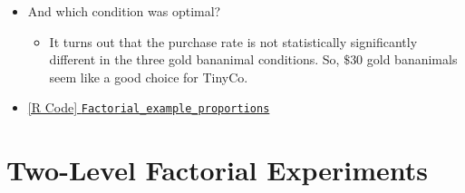 \begin{itemize}
\begin{itemize}
            \end{itemize}
      \item And which condition was optimal?
            \begin{itemize}
                  \item It turns out that the purchase rate is not statistically significantly different in
                        the three gold bananimal conditions. So, $ \$30 $ gold bananimals seem like a good choice for TinyCo.
            \end{itemize}
      \item \href{https://github.com/Hextical/university-notes/blob/master/year-3/semester-3/STAT 430/code/W8/Factorial_example_proportions.R}{[R Code] \texttt{Factorial\_example\_proportions}}
\end{itemize}
\section{Two-Level Factorial Experiments}

